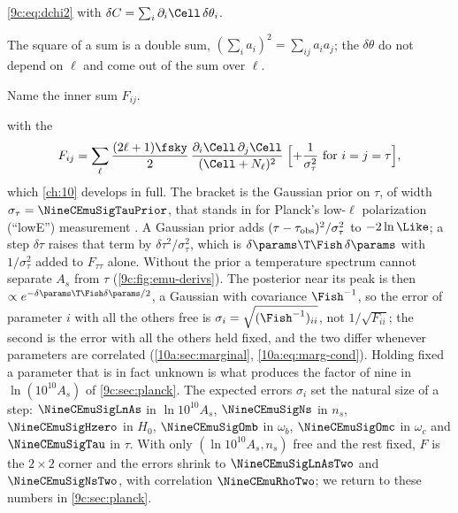 \begin{explain}
  \item \eqref{9c:eq:dchi2} with $\delta C=\sum_i\partial_i\Cell\,\delta\theta_i$.
  \item The square of a sum is a double sum, $(\sum_ia_i)^2=\sum_{ij}a_ia_j$; the $\delta\theta$ do not depend on
        $\ell$ and come out of the sum over $\ell$.
  \item Name the inner sum $F_{ij}$.
\end{explain}
with the 
\begin{equation}
  F_{ij}=\sum_\ell\frac{(2\ell+1)\fsky}{2}\,\frac{\partial_i\Cell\,\partial_j\Cell}{(\Cell+N_\ell)^2}
  \;\Bigl[+\frac{1}{\sigma_\tau^2}\ \text{for}\ i=j=\tau\Bigr],
  \label{9c:eq:fisher-cl}
\end{equation}
which \cref{ch:10} develops in full. The bracket is the Gaussian prior on $\tau$, of width
$\sigma_\tau=\NineCEmuSigTauPrior$, that stands in for Planck's low-$\ell$ polarization (``lowE'') measurement
\cite{Planck2018VI}. A Gaussian prior adds $(\tau-\tau_{\rm obs})^2/\sigma_\tau^2$ to $-2\ln\Like$; a step
$\delta\tau$ raises that term by $\delta\tau^2/\sigma_\tau^2$, which is $\delta\params\T\Fish\,\delta\params$ with
$1/\sigma_\tau^2$ added to $F_{\tau\tau}$ alone. Without the prior a temperature spectrum cannot separate $A_s$ from
$\tau$ (\cref{9c:fig:emu-derivs}). The posterior near its peak is then $\propto e^{-\delta\params\T\Fish\delta\params/2}$, a
Gaussian with covariance $\Fish^{-1}$, so the error of parameter $i$ with all the others free is
$\sigma_i=\sqrt{(\Fish^{-1})_{ii}}$, not $1/\sqrt{F_{ii}}$; the second is the error with all the others held fixed, and
the two differ whenever parameters are correlated (\cref{10a:sec:marginal}, \eqref{10a:eq:marg-cond}). Holding
fixed a parameter that is in fact unknown is what produces the factor of nine in $\ln(10^{10}A_s)$ of
\cref{9c:sec:planck}.
The expected errors $\sigma_i$ set the natural size of a
step: $\NineCEmuSigLnAs$ in $\ln10^{10}A_s$, $\NineCEmuSigNs$ in $n_s$, $\NineCEmuSigHzero$ in $H_0$,
$\NineCEmuSigOmb$ in $\omega_b$, $\NineCEmuSigOmc$ in $\omega_c$ and $\NineCEmuSigTau$ in $\tau$. With only
$(\ln10^{10}A_s,n_s)$ free and the rest fixed, $F$ is the $2\times2$ corner and the errors shrink to
$\NineCEmuSigLnAsTwo$ and $\NineCEmuSigNsTwo$, with correlation $\NineCEmuRhoTwo$; we return to these numbers in
\cref{9c:sec:planck}.

